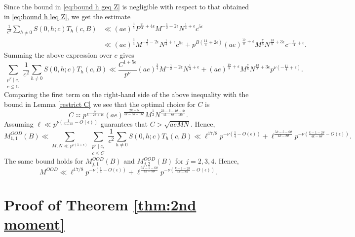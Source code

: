 \documentclass[12pt]{amsart}
\theoremstyle{plain}
\theoremstyle{definition}
\begin{document}
Since the bound in \eqref{eq:bound h geq Z} is negligible with respect to that obtained in \eqref{eq:bound h leq Z}, we get the estimate
    \begin{align*}
  \frac{1}{c^2}  \sum_{h\neq 0} S(0,h;c) T_h(c, B)
    &
    \ll (ae)^{\frac34} P^{\frac{11}4+4\epsilon} M^{-\frac12-2\epsilon}
    N^{\frac14+\epsilon} c^{5\epsilon} \\&
\ll  (ae)^{\frac34}  M^{-\frac12-2\epsilon}
    N^{\frac14+\epsilon} c^{5\epsilon}
 +  p^{B(\frac{11}{4}+2\epsilon)}(ae)^{\frac{17}{8}+\epsilon}  M^{\frac{7}{8}}
    N^{\frac{13}{8}+3\epsilon} c^{-\frac{11}{4}+\epsilon}  .
\end{align*}
Summing the above expression over $c$ gives
\[
\sum_{\substack{p^\nu \mid c, \\ c\leq C}}  \frac{1}{c^2} 
 \sum_{h\neq 0} S(0,h;c) T_h(c, B) 
 \ll 
 \frac{C^{1+5\epsilon}}{p^\nu} (ae)^{\frac34}  M^{-\frac12-2\epsilon}
    N^{\frac14+\epsilon} 
    +  (ae)^{\frac{17}{8}+\epsilon}  M^{\frac{7}{8}}
    N^{\frac{13}{8}+3\epsilon} p^{\nu(-\frac{11}{4}+\epsilon)}.
\]  
Comparing the first term on the right-hand side of the above inequality with the bound in Lemma \ref{restrict C} we see that the optimal choice for $C$ is 
\begin{equation}\label{eqn:choiceC}
C\asymp p^{\frac{\nu}{k-2\theta+4\epsilon}} (ae)^{\frac{2k-5}{4k-8\theta+16\epsilon}}M^{\frac{1}{2}} N^{\frac{2k-3-4\theta-4\epsilon}{4k-8\theta+16\epsilon}} .
\end{equation}
Assuming $\ell\ll p^{\nu\left(\frac{1}{5-4\theta}-O(\epsilon)\right)}$ guarantees that $C>\sqrt{aeMN}$. Hence,
\[
M_{1,1}^{OOD}(B) \ll\sum_{M, N \ll p^{\nu(1+\epsilon)}}   
\sum_{\substack{p^\nu \mid c, \\ c\leq C}}  \frac{1}{c^2} 
 \sum_{h\neq 0} S(0,h;c) T_h(c, B) 
 \ll 
\ell^{17/8}p^{-\nu\left(\frac14-O(\epsilon)\right)}
+
\ell^{\frac{5k-5-6\theta}{4k-8\theta}}
p^{-\nu\left(\frac{k-1-2\theta}{4k-8\theta}-O(\epsilon)\right)}.\]
The same bound holds for $M^{OOD}_{j,1}(B)$ and $M^{OOD}_{j,2}(B)$ for $j=2,3,4$. Hence, 
\begin{equation}\label{eqn:bound-MOOD}
M^{OOD}\ll \ell^{17/8}p^{-\nu\left(\frac14-O(\epsilon)\right)}
+
\ell^{\frac{5k-5-6\theta}{4k-8\theta}}
p^{-\nu\left(\frac{k-1-2\theta}{4k-8\theta}-O(\epsilon)\right)}.
\end{equation}







\section{Proof of Theorem \ref{thm:2nd moment}}\label{sec:proof-main}
\end{document}
